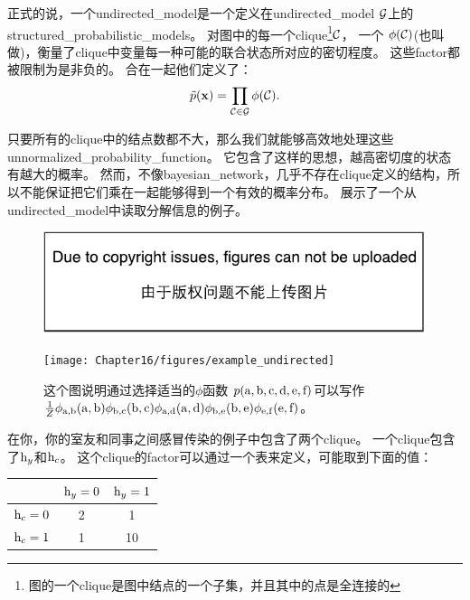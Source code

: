 正式的说，一个\gls{undirected_model}是一个定义在\gls{undirected_model} $\mathcal{G}$上的\gls{structured_probabilistic_models}。
对图中的每一个\gls{clique}\footnote{图的一个\gls{clique}是图中结点的一个子集，并且其中的点是全连接的}$\mathcal{C}$，
一个 $\phi(\mathcal{C})$(也叫做)，衡量了\gls{clique}中变量每一种可能的联合状态所对应的密切程度。
这些\gls{factor}都被限制为是非负的。
合在一起他们定义了：
\begin{align}
\label{eqn:163}
\tilde{p}(\mathbf{x}) = \prod_{\mathcal{C}\in\mathcal{G}} \phi(\mathcal{C}).
\end{align}


只要所有的\gls{clique}中的结点数都不大，那么我们就能够高效地处理这些\gls{unnormalized_probability_function}。
它包含了这样的思想，越高密切度的状态有越大的概率。
然而，不像\gls{bayesian_network}，几乎不存在\gls{clique}定义的结构，所以不能保证把它们乘在一起能够得到一个有效的概率分布。
展示了一个从\gls{undirected_model}中读取分解信息的例子。

\begin{figure}[!htb]
\ifOpenSource
\centerline{\includegraphics{figure.pdf}}
\else
	\centerline{\texttt{[image: Chapter16/figures/example\_undirected]}}
\fi
	\caption{这个图说明通过选择适当的$\phi$函数
		$p(\mathrm{a},\mathrm{b},\mathrm{c},\mathrm{d},\mathrm{e},\mathrm{f})$可以写作
		$\frac{1}{Z}\phi_{\mathrm{a},\mathrm{b}}(\mathrm{a},\mathrm{b})\phi_{\mathrm{b},\mathrm{c}}(\mathrm{b},\mathrm{c})\phi_{\mathrm{a},\mathrm{d}}(\mathrm{a},\mathrm{d})\phi_{\mathrm{b},\mathrm{e}}(\mathrm{b},\mathrm{e})\phi_{\mathrm{e},\mathrm{f}}(\mathrm{e},\mathrm{f})$。}
	\label{fig:example_undirected}
\end{figure}



在你，你的室友和同事之间感冒传染的例子中包含了两个\gls{clique}。
一个\gls{clique}包含了$\mathrm{h}_y$和$\mathrm{h}_c$。
这个\gls{clique}的\gls{factor}可以通过一个表来定义，可能取到下面的值：
\begin{table}
	\centering
\begin{tabular}{c|cc}
		& $\mathrm{h}_y = 0$ & $\mathrm{h}_y = 1$ \\ \hline
		$\mathrm{h}_c = 0$ & 2 & 1 \\
		$\mathrm{h}_c = 1$  & 1 & 10 \\
\end{tabular}
\end{table}


